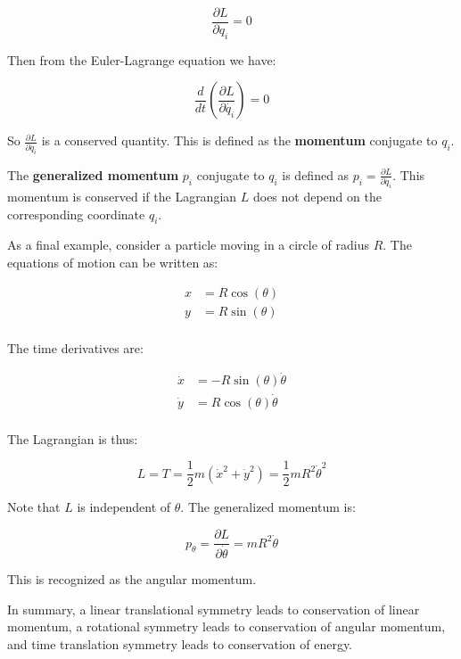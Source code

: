\begin{equation}
    \frac{\partial L}{\partial q_i} = 0
\end{equation}

Then from the Euler-Lagrange equation we have:

\begin{equation}
    \frac{d}{dt} \left(\frac{\partial L}{\partial \dot{q_i}}\right) = 0
\end{equation}

So $\frac{\partial L}{\partial \dot{q_i}}$ is a conserved quantity. This is defined as 
the \textbf{momentum} conjugate to $q_i$.

\begin{definition}
    The \textbf{generalized momentum} $p_i$ conjugate to $q_i$ is defined as $p_i = \frac{\partial L}{\partial \dot{q_i}}$.
    This momentum is conserved if the Lagrangian $L$ does not depend on the corresponding coordinate $q_i$.
\end{definition}

As a final example, consider a particle moving in a circle of radius $R$. The equations 
of motion can be written as:

\begin{align}
    x&=R\cos(\theta)\\
    y&=R\sin(\theta)\\
\end{align}

The time derivatives are:

\begin{align}
    \dot{x}&=-R\sin(\theta)\dot{\theta}\\
    \dot{y}&=R\cos(\theta)\dot{\theta}\\
\end{align}

The Lagrangian is thus:

\begin{equation}
    L = T = \frac{1}{2} m (\dot{x}^2+\dot{y}^2) = \frac{1}{2} m R^2 \dot{\theta}^2
\end{equation}

Note that $L$ is independent of $\theta$. The generalized momentum is:

\begin{equation}
    p_\theta =  \frac{\partial L}{\partial\dot{\theta}} = m R^2 \dot{\theta}
\end{equation}

This is recognized as the angular momentum.

In summary, a linear translational symmetry leads to conservation of linear momentum, a 
rotational symmetry leads to conservation of angular momentum, and time translation 
symmetry leads to conservation of energy.